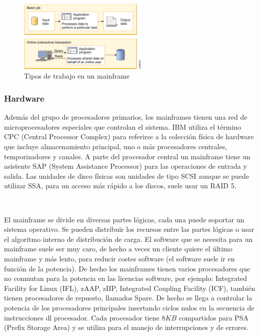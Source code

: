 \documentclass[paper=a4, fontsize=10pt]{scrartcl} %
\numberwithin{equation}{section} %
\numberwithin{figure}{section} %
\numberwithin{table}{section} %
\begin{document}
\begin{figure}[H]
	\centering
	\label{workloads}
	\includegraphics[trim = 0mm 0mm 5mm 0mm, clip, width=0.55\textwidth]{./Imagenes/workloads.png}
	\caption{Tipos de trabajo en un mainframe \cite{ibm-mainframes}}
\end{figure}

\subsubsection{Hardware}
Además del grupo de procesadores primarios, los mainframes tienen una red de microprocesadores especiales que controlan el sistema.
IBM utiliza el término CPC (Central Processor Complex) para referirse a la colección física de hardware que incluye almacenamiento principal, uno o más procesadores centrales, temporizadores y canales.
A parte del procesador central un mainframe tiene un asistente SAP (System Assistance Processor) para las operaciones de entrada y salida.
Las unidades de disco físicas son unidades de tipo SCSI aunque se puede utilizar SSA, para un acceso más rápido a los discos, suele usar un RAID 5.

\

El mainframe se divide en diversas partes lógicas, cada una puede soportar un sistema operativo.
Se pueden distribuir los recursos entre las partes lógicas o usar el algoritmo interno de distribución de carga.
El software que se necesita para un mainframe suele ser muy caro, de hecho a veces un cliente quiere el último mainframe y más lento, para reducir costes software (el software suele ir en función de la potencia).
De hecho los mainframes tienen varios procesadores que no conmutan para la potencia en las licencias software, por ejemplo: Integrated Facility for Linux (IFL), zAAP, zIIP, Integrated Coupling Facility (ICF), también tienen procesadores de repuesto, llamados Spare. 
De hecho se llega a controlar la potencia de los procesadores principales insertando ciclos nulos en la secuencia de instrucciones dl procesador.
Cada procesador tiene $8KB$ compartidos para PSA (Prefix Storage Area) y se utiliza para el manejo de interrupciones y de errores.
\end{document}

